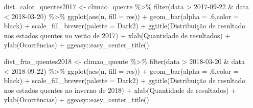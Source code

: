 \documentclass[
]{article}
\newenvironment{Shaded}{\begin{snugshade}}{\end{snugshade}}
\newcommand{\AttributeTok}[1]{\textcolor[rgb]{0.77,0.63,0.00}{#1}}
\newcommand{\DecValTok}[1]{\textcolor[rgb]{0.00,0.00,0.81}{#1}}
\newcommand{\FunctionTok}[1]{\textcolor[rgb]{0.00,0.00,0.00}{#1}}
\newcommand{\NormalTok}[1]{#1}
\newcommand{\OtherTok}[1]{\textcolor[rgb]{0.56,0.35,0.01}{#1}}
\newcommand{\SpecialCharTok}[1]{\textcolor[rgb]{0.00,0.00,0.00}{#1}}
\newcommand{\StringTok}[1]{\textcolor[rgb]{0.31,0.60,0.02}{#1}}
\begin{document}
\begin{Shaded}
\begin{Highlighting}[]
\NormalTok{dist\_calor\_quentes2017 }\OtherTok{\textless{}{-}}\NormalTok{ climao\_quente }\SpecialCharTok{\%\textgreater{}\%} 
  \FunctionTok{filter}\NormalTok{(data }\SpecialCharTok{\textgreater{}} \StringTok{\textquotesingle{}2017{-}09{-}22\textquotesingle{}} \SpecialCharTok{\&}\NormalTok{ data }\SpecialCharTok{\textless{}} \StringTok{\textquotesingle{}2018{-}03{-}20\textquotesingle{}}\NormalTok{) }\SpecialCharTok{\%\textgreater{}\%}
  \FunctionTok{ggplot}\NormalTok{(}\FunctionTok{aes}\NormalTok{(n, }\AttributeTok{fill =}\NormalTok{ res)) }\SpecialCharTok{+} 
  \FunctionTok{geom\_bar}\NormalTok{(}\AttributeTok{alpha =}\NormalTok{ .}\DecValTok{6}\NormalTok{,}\AttributeTok{color =} \StringTok{\textquotesingle{}black\textquotesingle{}}\NormalTok{) }\SpecialCharTok{+} 
  \FunctionTok{scale\_fill\_brewer}\NormalTok{(}\AttributeTok{palette =} \StringTok{\textquotesingle{}Dark2\textquotesingle{}}\NormalTok{) }\SpecialCharTok{+}
  \FunctionTok{ggtitle}\NormalTok{(}\StringTok{\textquotesingle{}Distribuição de resultado nos estados quentes no verão de 2017\textquotesingle{}}\NormalTok{) }\SpecialCharTok{+}
  \FunctionTok{xlab}\NormalTok{(}\StringTok{\textquotesingle{}Quantidade de resultados\textquotesingle{}}\NormalTok{) }\SpecialCharTok{+} \FunctionTok{ylab}\NormalTok{(}\StringTok{\textquotesingle{}Ocorrências\textquotesingle{}}\NormalTok{) }\SpecialCharTok{+}
\NormalTok{  ggeasy}\SpecialCharTok{::}\FunctionTok{easy\_center\_title}\NormalTok{()}


\NormalTok{dist\_frio\_quentes2018 }\OtherTok{\textless{}{-}}\NormalTok{ climao\_quente }\SpecialCharTok{\%\textgreater{}\%} 
  \FunctionTok{filter}\NormalTok{(data }\SpecialCharTok{\textgreater{}} \StringTok{\textquotesingle{}2018{-}03{-}20\textquotesingle{}} \SpecialCharTok{\&}\NormalTok{ data }\SpecialCharTok{\textless{}} \StringTok{\textquotesingle{}2018{-}09{-}22\textquotesingle{}}\NormalTok{) }\SpecialCharTok{\%\textgreater{}\%}
  \FunctionTok{ggplot}\NormalTok{(}\FunctionTok{aes}\NormalTok{(n, }\AttributeTok{fill =}\NormalTok{ res)) }\SpecialCharTok{+} 
  \FunctionTok{geom\_bar}\NormalTok{(}\AttributeTok{alpha =}\NormalTok{ .}\DecValTok{6}\NormalTok{,}\AttributeTok{color =} \StringTok{\textquotesingle{}black\textquotesingle{}}\NormalTok{) }\SpecialCharTok{+} 
  \FunctionTok{scale\_fill\_brewer}\NormalTok{(}\AttributeTok{palette =} \StringTok{\textquotesingle{}Dark2\textquotesingle{}}\NormalTok{) }\SpecialCharTok{+}
  \FunctionTok{ggtitle}\NormalTok{(}\StringTok{\textquotesingle{}Distribuição de resultado nos estados quentes no inverno de 2018\textquotesingle{}}\NormalTok{) }\SpecialCharTok{+}
  \FunctionTok{xlab}\NormalTok{(}\StringTok{\textquotesingle{}Quantidade de resultados\textquotesingle{}}\NormalTok{) }\SpecialCharTok{+} \FunctionTok{ylab}\NormalTok{(}\StringTok{\textquotesingle{}Ocorrências\textquotesingle{}}\NormalTok{) }\SpecialCharTok{+}
\NormalTok{  ggeasy}\SpecialCharTok{::}\FunctionTok{easy\_center\_title}\NormalTok{()}


\end{Highlighting}
\end{Shaded}
\end{document}
